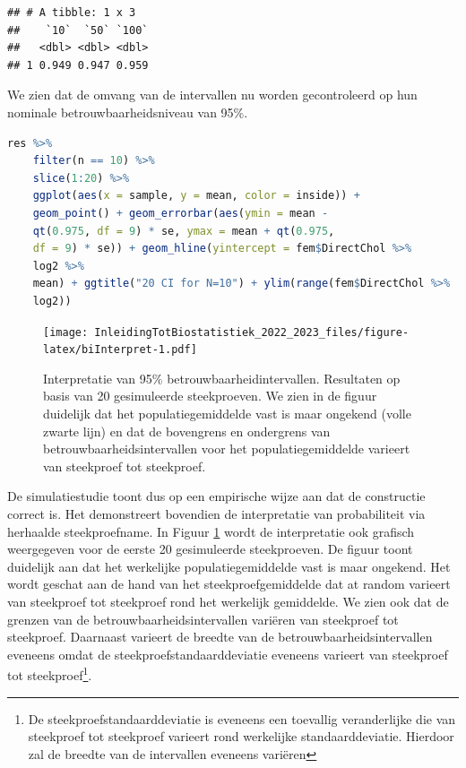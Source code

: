 \documentclass[
  12pt,dutch,coursenotes]{book}
\begin{document}
\begin{lstlisting}
## # A tibble: 1 x 3
##    `10`  `50` `100`
##   <dbl> <dbl> <dbl>
## 1 0.949 0.947 0.959
\end{lstlisting}

We zien dat de omvang van de intervallen nu worden gecontroleerd op hun nominale betrouwbaarheidsniveau van 95\%.

\begin{lstlisting}[language=R]
res %>%
    filter(n == 10) %>%
    slice(1:20) %>%
    ggplot(aes(x = sample, y = mean, color = inside)) +
    geom_point() + geom_errorbar(aes(ymin = mean -
    qt(0.975, df = 9) * se, ymax = mean + qt(0.975,
    df = 9) * se)) + geom_hline(yintercept = fem$DirectChol %>%
    log2 %>%
    mean) + ggtitle("20 CI for N=10") + ylim(range(fem$DirectChol %>%
    log2))
\end{lstlisting}

\begin{figure}
\centering
\texttt{[image: InleidingTotBiostatistiek\_2022\_2023\_files/figure-latex/biInterpret-1.pdf]}
\caption{\label{fig:biInterpret}Interpretatie van 95\(\%\) betrouwbaarheidintervallen. Resultaten op basis van 20 gesimuleerde steekproeven. We zien in de figuur duidelijk dat het populatiegemiddelde vast is maar ongekend (volle zwarte lijn) en dat de bovengrens en ondergrens van betrouwbaarheidsintervallen voor het populatiegemiddelde varieert van steekproef tot steekproef.}
\end{figure}

De simulatiestudie toont dus op een empirische wijze aan dat de constructie correct is.
Het demonstreert bovendien de interpretatie van probabiliteit via herhaalde steekproefname.
In Figuur \ref{fig:biInterpret} wordt de interpretatie ook grafisch weergegeven voor de eerste 20 gesimuleerde steekproeven. De figuur toont duidelijk aan dat het werkelijke populatiegemiddelde vast is maar ongekend. Het wordt geschat aan de hand van het steekproefgemiddelde dat at random varieert van steekproef tot steekproef rond het werkelijk gemiddelde.
We zien ook dat de grenzen van de betrouwbaarheidsintervallen variëren van steekproef tot steekproef.
Daarnaast varieert de breedte van de betrouwbaarheidsintervallen eveneens omdat de steekproefstandaarddeviatie eveneens varieert van steekproef tot steekproef\footnote{De steekproefstandaarddeviatie is eveneens een toevallig veranderlijke die van steekproef tot steekproef varieert rond werkelijke standaarddeviatie. Hierdoor zal de breedte van de intervallen eveneens variëren}.
\end{document}
